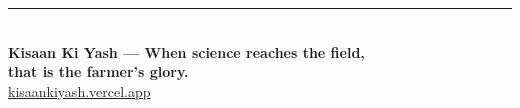\documentclass[12pt,a4paper]{article}
\begin{document}
\vspace{0.6cm}

\begin{center}
{\color{sectionBar}\rule{0.6\linewidth}{1.5pt}}\\[10pt]
{\large\bfseries\color{primaryGreen} Kisaan Ki Yash --- When science reaches the field,}\\
{\large\bfseries\color{primaryGreen} that is the farmer's glory.}\\[8pt]
{\normalsize\color{deepTeal}\href{https://kisaankiyash.vercel.app}{kisaankiyash.vercel.app}}
\end{center}
\end{document}
